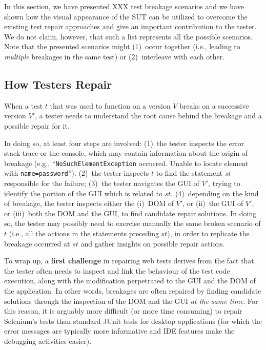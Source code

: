 In this section, we have presented XXX   test breakage scenarios and we have shown how the visual appearance of the SUT can be utilized to overcome the existing test repair approaches and give an important contribution to the tester. We do not claim, however, that such a list represents all the possible scenarios. Note that the presented scenarios might (1)~occur together (i.e., leading to \textit{multiple} breakages in the same test) or (2)~interleave with each other.


\subsection{How Testers Repair}

When a test $t$ that was used to function on a version $V$  breaks on a successive version $V'$, a tester needs to understand the root cause behind the breakage and a possible repair for it. 

In doing so, at least four steps are involved: 
(1)~the tester inspects the error stack trace or the console, which may contain information about the origin of breakage (e.g., ``\texttt{NoSuchElementException} occurred. Unable to locate element with \mbox{\texttt{name=password}}''). 
(2)~the tester inspects $t$ to find the statement $st$ responsible for the failure; %
(3)~the tester navigates the GUI of $V'$, trying to identify the portion of the GUI which is related to $st$. 
(4)~depending on the kind of breakage, the tester inspects either the (i)~DOM of $V'$, or (ii)~the GUI of $V'$, or (iii)~both the DOM and the GUI, to find candidate repair solutions. In doing so, the tester may possibly need to exercise manually the same broken scenario of $t$ (i.e., all the actions in the statements preceding $st$), in order to replicate the breakage occurred at $st$ and gather insights on possible repair actions.

To wrap up, a \textbf{first challenge} in repairing web tests derives from the fact that  
the tester often needs to inspect and link the behaviour of the test code execution, along with the modification perpetrated to the GUI and the DOM of the application. 
In other words, breakages are often repaired by finding candidate solutions through the inspection of the DOM and the GUI \textit{at the same time}.
For this reason, it is arguably more difficult (or more time consuming) to repair Selenium's tests than standard JUnit tests for desktop applications (for which the error messages are typically more informative and IDE features make the debugging activities easier).


